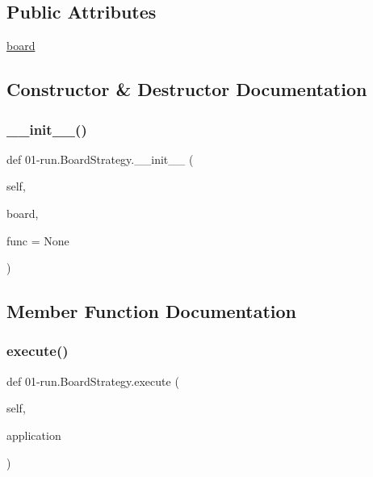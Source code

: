 \subsection*{Public Attributes}
\begin{DoxyCompactItemize}
\item 
\hyperlink{class01-run_1_1BoardStrategy_abf87e8d3a40c7d97f2b12934a630d9c2}{board}
\end{DoxyCompactItemize}


\subsection{Constructor \& Destructor Documentation}
\mbox{\label{class01-run_1_1BoardStrategy_a631883dc0899e645522db930b2ca1452}} 
\subsubsection{\texorpdfstring{\+\_\+\+\_\+init\+\_\+\+\_\+()}{\_\_init\_\_()}}
{\footnotesize\ttfamily def 01-\/run.\+Board\+Strategy.\+\_\+\+\_\+init\+\_\+\+\_\+ (\begin{DoxyParamCaption}\item[{}]{self,  }\item[{}]{board,  }\item[{}]{func = {\ttfamily None} }\end{DoxyParamCaption})}



\subsection{Member Function Documentation}
\mbox{\label{class01-run_1_1BoardStrategy_a82091d8b8fe9cbc8eba93a459e7cfb12}} 
\subsubsection{\texorpdfstring{execute()}{execute()}}
{\footnotesize\ttfamily def 01-\/run.\+Board\+Strategy.\+execute (\begin{DoxyParamCaption}\item[{}]{self,  }\item[{}]{application }\end{DoxyParamCaption})}



